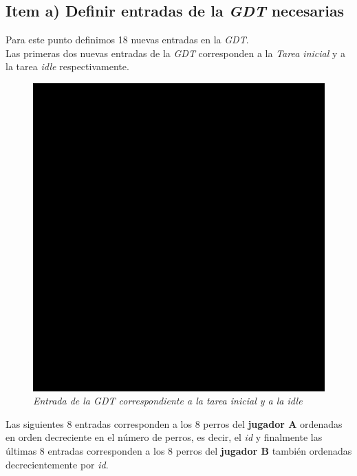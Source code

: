 \subsection{Item a) Definir entradas de la \textit{GDT} necesarias}
Para este punto definimos 18 nuevas entradas en la \textit{GDT}.\\

Las primeras dos nuevas entradas de la \textit{GDT} corresponden a la \textit{Tarea inicial} y a la tarea \textit{idle} respectivamente. 


\begin{figure}[H]
\begin{center}
\includegraphics[width=\linewidth]{ejercicio6/gdt_inicial_idle.png}
\caption{{\small \textit{Entrada de la \textit{GDT} correspondiente a la tarea inicial y a la idle }}}
\endminipage
\end{center}
\end{figure}

Las siguientes 8 entradas corresponden a los 8 perros del \textbf{jugador A} ordenadas en orden decreciente en el número de perros, es decir, el \textit{id} y finalmente las últimas 8 entradas corresponden a los 8 perros del \textbf{jugador B } también ordenadas decrecientemente por \textit{id}.\\

